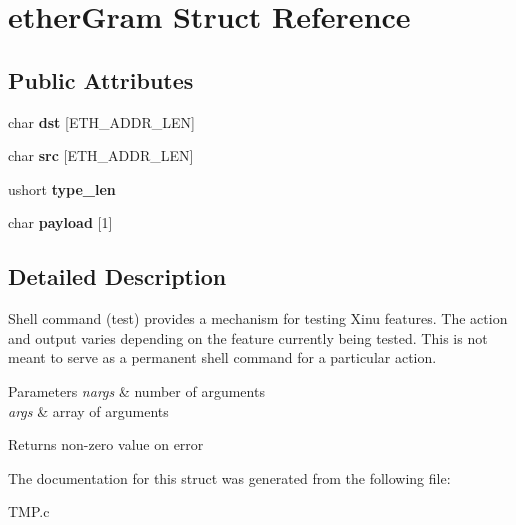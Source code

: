 \hypertarget{structetherGram}{\section{ether\-Gram Struct Reference}
\label{structetherGram}
}
\subsection*{Public Attributes}
\begin{DoxyCompactItemize}
\item 
\hypertarget{structetherGram_a07c78e76ca42a80f81d690553c71d44d}{char {\bfseries dst} \mbox{[}E\-T\-H\-\_\-\-A\-D\-D\-R\-\_\-\-L\-E\-N\mbox{]}}\label{structetherGram_a07c78e76ca42a80f81d690553c71d44d}

\item 
\hypertarget{structetherGram_acebc1d055eb534efd908a7983ead7ed8}{char {\bfseries src} \mbox{[}E\-T\-H\-\_\-\-A\-D\-D\-R\-\_\-\-L\-E\-N\mbox{]}}\label{structetherGram_acebc1d055eb534efd908a7983ead7ed8}

\item 
\hypertarget{structetherGram_ab6fd9beed28280c5ecf166df0f12b066}{ushort {\bfseries type\-\_\-len}}\label{structetherGram_ab6fd9beed28280c5ecf166df0f12b066}

\item 
\hypertarget{structetherGram_a6ce1f78074249931f3a2c29813ae8427}{char {\bfseries payload} \mbox{[}1\mbox{]}}\label{structetherGram_a6ce1f78074249931f3a2c29813ae8427}

\end{DoxyCompactItemize}


\subsection{Detailed Description}
Shell command (test) provides a mechanism for testing Xinu features. The action and output varies depending on the feature currently being tested. This is not meant to serve as a permanent shell command for a particular action. 
\begin{DoxyParams}{Parameters}
{\em nargs} & number of arguments \\
\hline
{\em args} & array of arguments \\
\hline
\end{DoxyParams}
\begin{DoxyReturn}{Returns}
non-\/zero value on error 
\end{DoxyReturn}


The documentation for this struct was generated from the following file\-:\begin{DoxyCompactItemize}
\item 
T\-M\-P.\-c\end{DoxyCompactItemize}
